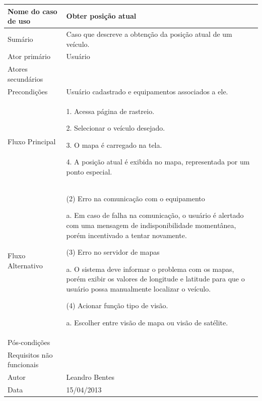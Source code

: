 \begin{flushleft}
\tablefirsthead{}
\tablehead{}
\tabletail{}
\tablelasttail{}
\begin{supertabular}{|m{5.5680003cm}|m{9.325cm}|}
\hline
Nome do caso de uso &
Obter posição atual\\\hline
Sumário &
Caso que descreve a obtenção da posição atual de um veículo. \\\hline
Ator primário &
Usuário\\\hline
Atores secundários &
~
\\\hline
Precondições &
Usuário cadastrado e equipamentos associados a ele. \\\hline
Fluxo Principal &
1. Acessa página de rastreio.

2. Selecionar o veículo desejado.

3. O mapa é carregado na tela.

4. A posição atual é exibida no mapa, representada por um ponto especial.\\\hline
Fluxo Alternativo &
(2) Erro na comunicação com o equipamento

a. Em caso de falha na comunicação, o usuário é alertado com uma mensagem de indisponibilidade momentânea, porém incentivado a tentar novamente.

(3) Erro no servidor de mapas

a. O sistema deve informar o problema com os mapas, porém exibir os valores de longitude e latitude para que o usuário possa manualmente localizar o veículo.

(4) Acionar função tipo de visão.

a. Escolher entre visão de mapa ou visão de satélite.\\\hline
Pós-condições &
~
\\\hline
Requisitos não funcionais &
~\\\hline
Autor &
Leandro Bentes\\\hline
Data &
15/04/2013\\\hline
\end{supertabular}
\end{flushleft}

